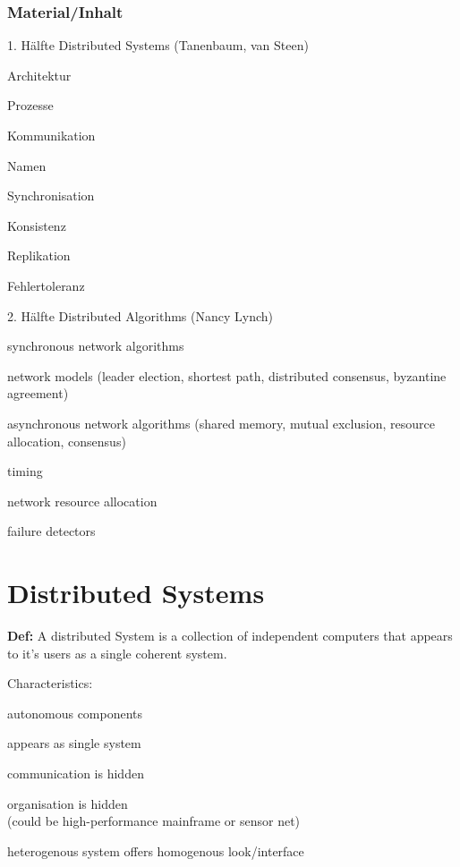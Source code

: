 \documentclass[ngerman,a4paper]{report}
\begin{document}
\subsection{Material/Inhalt}
\begin{compactitem}
\item[1. Hälfte] Distributed Systems (Tanenbaum, van Steen)
	\begin{compactitem}
	\item Architektur
	\item Prozesse
	\item Kommunikation
	\item Namen
	\item Synchronisation
	\item Konsistenz
	\item Replikation
	\item Fehlertoleranz
	\end{compactitem}
\item[2. Hälfte] Distributed Algorithms (Nancy Lynch)
	\begin{compactitem}
	\item synchronous network algorithms
	\item network models (leader election, shortest path, distributed consensus, byzantine agreement)
	\item asynchronous network algorithms (shared memory, mutual exclusion, resource allocation, consensus)
	\item timing
	\item network resource allocation
	\item failure detectors
	\end{compactitem}
\end{compactitem}

\chapter{Distributed Systems}
\textbf{Def:} A distributed System is a collection of independent computers that appears to it's users as a single coherent system.

Characteristics:\\
\begin{compactitem}
\item autonomous components
\item appears as single system
\item communication is hidden
\item organisation is hidden \\(could be high-performance mainframe or sensor net)
\item heterogenous system offers homogenous look/interface
\end{compactitem}
\end{document}
